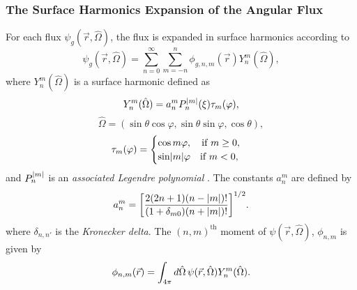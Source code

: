 \subsubsection{The Surface Harmonics Expansion of the Angular Flux}

For each flux $\psi_{g}(\vec{r},\hat{\Omega})$, the flux is expanded in surface harmonics according to
\begin{equation}
	\psi_{g}(\vec{r},\hat{\Omega}) = \sum_{n=0}^{\infty} \sum_{m=-n}^{n} \phi_{g,n,m}(\vec{r}) Y_{n}^{m}(\hat{\Omega}),
\end{equation}
where $Y_{n}^{m}(\hat{\Omega})$ is a surface harmonic defined as
\begin{equation}
	Y_{n}^{m}(\hat{\Omega}) = a_{n}^{m} P_{n}^{\lvert m\rvert}(\xi) \tau_{m}(\varphi),
\end{equation}
\begin{equation}
\hat{\Omega} = (\sin \theta \cos \varphi, \sin \theta \sin \varphi, \cos \theta),
\end{equation}
\begin{equation}
	\tau_{m}(\varphi) = \begin{cases}
					\cos m\varphi, \quad \text{if } m \geq 0, \\
					\sin \lvert m\rvert \varphi \quad \text{if } m < 0,
				      \end{cases}
\end{equation}
and $P_{n}^{\lvert m\rvert}$ is an \textit{associated Legendre polynomial} \cite{duderstadt_nuclear_1976}. The constants $a_{n}^{m}$ are defined by
\begin{equation}
	a_{n}^{m} = \bigg [ \frac{2(2n+1)(n-\lvert m\rvert)!}{(1+\delta_{m0})(n + \lvert m\rvert)!} \bigg ]^{1/2}.
\end{equation}
where $\delta_{n,n'}$ is the \textit{Kronecker delta}. The $(n,m)^{\text{th}}$ moment of $\psi(\vec{r}, \hat{\Omega})$, $\phi_{n,m}$ is given by
\begin{equation}
	\phi_{n,m}(\vec{r}) = \int_{4\pi} \mathop{}\!d \hat{\Omega} \, \psi(\vec{r},\hat{\Omega}) Y_{n}^{m}(\hat{\Omega}).
\end{equation}

